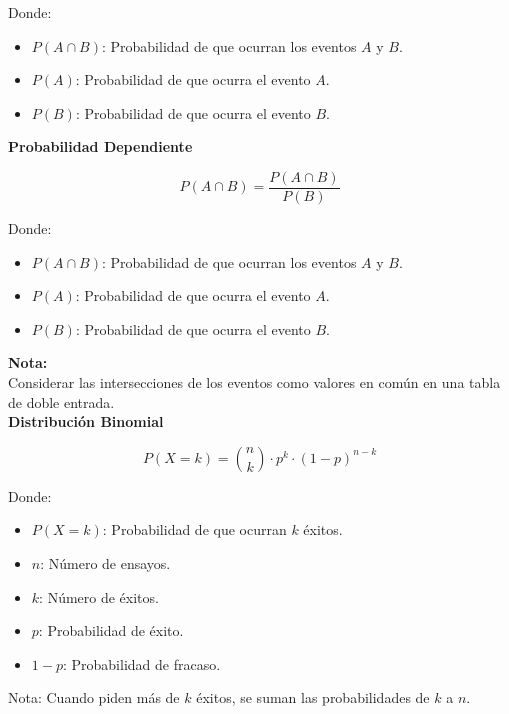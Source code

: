 \documentclass[11pt, a4paper]{article}
\newenvironment{probabilidadIndependiente}{}{}
\newenvironment{probabilidadDependiente}{}{}
\newenvironment{distribucionBinomial}{}{}
\begin{document}
\begin{multicols}{2}
\begin{probabilidadIndependiente}
\begin{center}
            \end{center}
            Donde:
            \begin{itemize}
                \item $P(A \cap B)$: Probabilidad de que ocurran los eventos $A$ y $B$.
                \item $P(A)$: Probabilidad de que ocurra el evento $A$.
                \item $P(B)$: Probabilidad de que ocurra el evento $B$.
            \end{itemize}
        \end{probabilidadIndependiente}
        \begin{probabilidadDependiente}
            \textbf{Probabilidad Dependiente}
            \hrulefill
            \begin{center}
                \begin{equation*}
                    P(A \cap B) = \dfrac{P\left(A \cap B\right)}{P\left(B\right)}
                \end{equation*}
            \end{center}
            Donde:
            \begin{itemize}
                \item $P(A \cap B)$: Probabilidad de que ocurran los eventos $A$ y $B$.
                \item $P(A)$: Probabilidad de que ocurra el evento $A$.
                \item $P(B)$: Probabilidad de que ocurra el evento $B$.
            \end{itemize}
            \textbf{Nota:}\\
            Considerar las intersecciones de los eventos como valores en común en una tabla de doble entrada.\\
        \end{probabilidadDependiente}
        \begin{distribucionBinomial}
            \textbf{Distribución Binomial}
            \hrulefill
            \begin{center}
                \begin{equation*}
                    P(X = k) = \binom{n}{k} \cdot p^k \cdot (1-p)^{n-k}
                \end{equation*}
            \end{center}
            Donde:
            \begin{itemize}
                \item $P(X = k)$: Probabilidad de que ocurran $k$ éxitos.
                \item $n$: Número de ensayos.
                \item $k$: Número de éxitos.
                \item $p$: Probabilidad de éxito.
                \item $1-p$: Probabilidad de fracaso.
            \end{itemize}
            Nota:
            Cuando piden más de $k$ éxitos, se suman las probabilidades de $k$ a $n$.
        \end{distribucionBinomial}
    \end{multicols}
\end{document}

